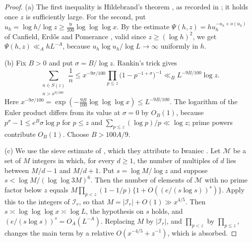\documentclass[11pt]{amsart}
\theoremstyle{remark}
\numberwithin{equation}{section}
\begin{document}
\begin{proof}
(a) The first inequality is Hildebrand's theorem \cite{Hil}, as recorded in \cite[Section~1.4]{Gra}; it holds once $z$ is sufficiently large. For the second, put $u_h=\log h/\log z\ge\frac{9}{100}\log\log\log x$. By the estimate $\Psi(h,z)=hu_h^{-u_h+o(u_h)}$ of Canfield, Erd\H{o}s and Pomerance \cite[(1.12)]{Gra}, valid since $z\ge(\log h)^2$, we get $\Psi(h,z)\ll_AhL^{-A}$, because $u_h\log u_h/\log L\to\infty$ uniformly in $h$.

(b) Fix $B>0$ and put $\sigma=B/\log z$. Rankin's trick gives
\[
\sum_{\substack{n\in S(z)\\ n>x^{9/100}}}\frac1n\le x^{-9\sigma/100}\prod_{p\le z}\bigl(1-p^{-1+\sigma}\bigr)^{-1}\ll_BL^{-9B/100}\log z .
\]
Here $x^{-9\sigma/100}=\exp(-\tfrac{9B}{100}\log\log\log x)\le L^{-9B/100}$. The logarithm of the Euler product differs from its value at $\sigma=0$ by $O_B(1)$, because $p^\sigma-1\le e^B\sigma\log p$ for $p\le z$ and $\sum_{p\le z}(\log p)/p\ll\log z$; prime powers contribute $O_B(1)$. Choose $B>100A/9$.

(c) We use the sieve estimate of \cite[Lemma~2.2]{HSX}, which they attribute to Iwaniec \cite[Theorem~3]{Iw}. Let $\mathcal M$ be a set of $M$ integers in which, for every $d\ge1$, the number of multiples of $d$ lies between $M/d-1$ and $M/d+1$. Put $s=\log M/\log z$ and suppose $s<\log M/(\log\log3M)^6$. Then the number of elements of $\mathcal M$ with no prime factor below $z$ equals $M\prod_{p<z}(1-1/p)\{1+O((e/(s\log s))^s)\}$. Apply this to the integers of $\mathcal I_r$, so that $M=|\mathcal I_r|+O(1)\gg x^{4/5}$. Then $s\asymp\log\log\log x\asymp\log L$, the hypothesis on $s$ holds, and $(e/(s\log s))^s=O_A(L^{-A})$. Replacing $M$ by $|\mathcal I_r|$, and $\prod_{p<z}$ by $\prod_{p\le z}$, changes the main term by a relative $O(x^{-4/5}+z^{-1})$, which is absorbed.
\end{proof}
\end{document}
